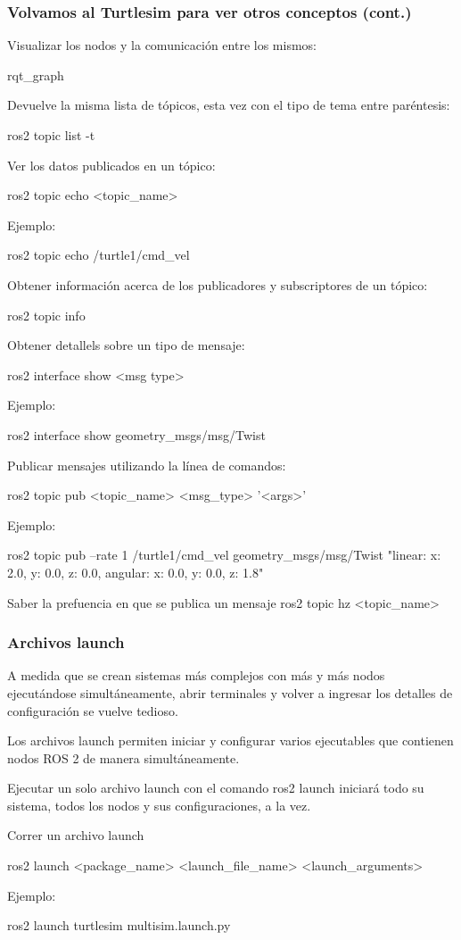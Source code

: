 \begin{frame}
    \frametitle{Volvamos al Turtlesim para ver otros conceptos (cont.)}
    
    Visualizar los nodos y la comunicación entre los mismos:
    
    rqt\_graph
    
    Devuelve la misma lista de tópicos, esta vez con el tipo de tema entre paréntesis:
    
    ros2 topic list -t
    
    Ver los datos publicados en un tópico:
    
    ros2 topic echo <topic\_name>
    
    Ejemplo:
    
    ros2 topic echo /turtle1/cmd\_vel
    
    Obtener información acerca de los publicadores y subscriptores de un tópico:
    
    ros2 topic info
    
    Obtener detallels sobre un tipo de mensaje:
    
    ros2 interface show <msg type>
    
    Ejemplo:
    
    ros2 interface show geometry\_msgs/msg/Twist
    
    Publicar mensajes utilizando la línea de comandos:
    
    ros2 topic pub <topic\_name> <msg\_type> '<args>'
    
    Ejemplo:
    
    ros2 topic pub --rate 1 /turtle1/cmd\_vel geometry\_msgs/msg/Twist "{linear: {x: 2.0, y: 0.0, z: 0.0}, angular: {x: 0.0, y: 0.0, z: 1.8}}"
    
    Saber la prefuencia en que se publica un mensaje
    ros2 topic hz <topic\_name>
    
\end{frame}

\begin{frame}
	\frametitle{Archivos launch}
	
	A medida que se crean sistemas más complejos con más y más nodos ejecutándose simultáneamente, abrir terminales y volver a ingresar los detalles de configuración se vuelve tedioso.
	
	Los archivos launch permiten iniciar y configurar varios ejecutables que contienen nodos ROS 2 de manera simultáneamente.
	
	Ejecutar un solo archivo launch con el comando ros2 launch iniciará todo su sistema, todos los nodos y sus configuraciones, a la vez.
	
    Correr un archivo launch

	ros2 launch <package\_name> <launch\_file\_name> <launch\_arguments>

	Ejemplo:

	ros2 launch turtlesim multisim.launch.py
	
\end{frame}



